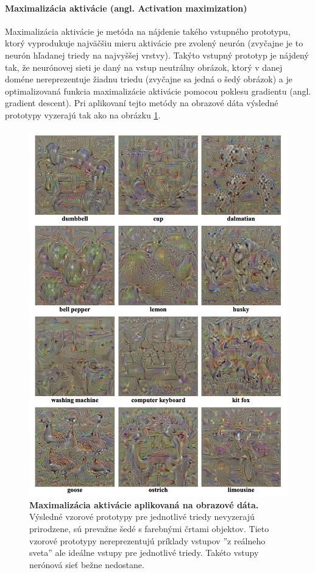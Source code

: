 \paragraph{Maximalizácia aktivácie (angl. Activation maximization)}
Maximalizácia aktivácie je metóda na nájdenie takého vstupného prototypu, ktorý vyprodukuje najväčšiu mieru aktivácie pre zvolený neurón (zvyčajne je to neurón hľadanej triedy na najvyššej vrstvy). 
Takýto vstupný prototyp je nájdený tak, že neurónovej sieti je daný na vstup neutrálny obrázok, ktorý v danej doméne nereprezentuje žiadnu triedu (zvyčajne sa jedná o šedý obrázok) a je optimalizovaná funkcia maximalizácie aktivácie pomocou poklesu gradientu \cite{montavon2018methods} (angl. gradient descent). Pri aplikovaní tejto metódy na obrazové dáta výsledné prototypy vyzerajú tak ako na obrázku \ref{fig:activation_maximization}.

\begin{figure}[h!]
\centering
\includegraphics[scale=0.6]{assets/images/activation_maximization.png}
\caption{\textbf{Maximalizácia aktivácie aplikovaná na obrazové dáta. \cite{simonyan2013deep}} Výsledné vzorové prototypy pre jednotlivé triedy nevyzerajú prirodzene, sú prevažne šedé s farebnými črtami objektov. Tieto vzorové prototypy nereprezentujú príklady vstupov ''z reálneho sveta'' ale ideálne vstupy pre jednotlivé triedy. Takéto vstupy nerónová sieť bežne nedostane.
}
\label{fig:activation_maximization}
\end{figure}

